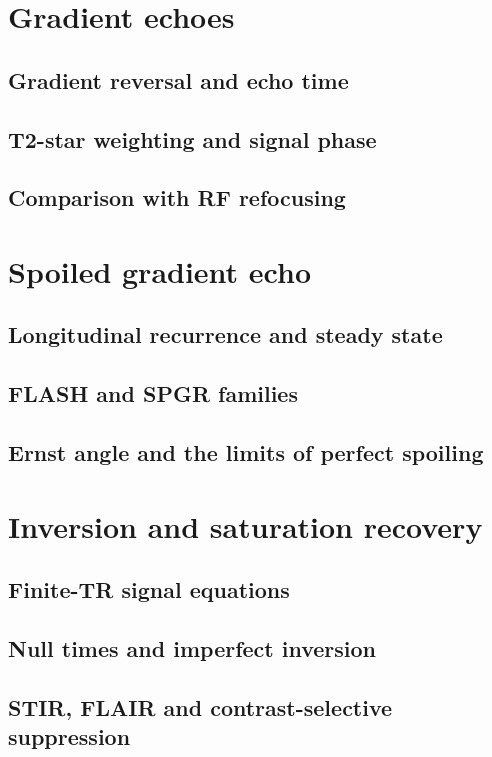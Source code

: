 \section{Gradient echoes}
\label{sec:07:gradient-echoes}
\subsection{Gradient reversal and echo time}
\subsection{T2-star weighting and signal phase}
\subsection{Comparison with RF refocusing}

\section{Spoiled gradient echo}
\label{sec:07:spoiled-gradient-echo}
\subsection{Longitudinal recurrence and steady state}
\subsection{FLASH and SPGR families}
\subsection{Ernst angle and the limits of perfect spoiling}

\section{Inversion and saturation recovery}
\label{sec:07:inversion-and-saturation-recovery}
\subsection{Finite-TR signal equations}
\subsection{Null times and imperfect inversion}
\subsection{STIR, FLAIR and contrast-selective suppression}

